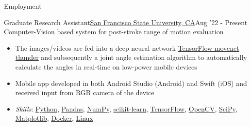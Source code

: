 \documentclass[]{mcdowellcv}
\begin{document}
    \makeheader
    
	\begin{cvsection}{Employment}
 \begin{cvsubsection}{Graduate Research Assistant}{\href{https://www.sfsu.edu/}{San Francisco State University, CA}}{Aug '22 - Present}
        Computer-Vision based system for post-stroke range of motion evaluation
			\begin{itemize}
                \item The images/videos are fed into a deep neural network \href{https://tfhub.dev/google/movenet/singlepose/thunder/4}{TensorFlow movenet thunder} and subsequently a joint angle estimation algorithm to automatically calculate the angles in real-time on low-power mobile devices
                \item Mobile app developed in both Android Studio (Android) and Swift (iOS) and received input from RGB camera of the device
                \item \textit{Skills}: \href{https://www.python.org/}{Python}, \href{https://pandas.pydata.org/}{Pandas}, \href{https://numpy.org/}{NumPy}, \href{https://scikit-learn.org/}{scikit-learn}, \href{https://www.tensorflow.org/}{TensorFlow}, \href{https://opencv.org/} {OpenCV}, \href{https://scipy.org/}{SciPy}, \href{https://matplotlib.org/}{Matplotlib}, \href {https://www.docker.com/}{Docker}, \href{https://www.linux.org/}{Linux}
			\end{itemize}
		\end{cvsubsection}
        \end{cvsection}
\end{document}
